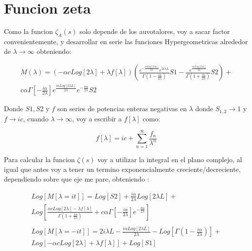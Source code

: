 \section{Funcion zeta}

Como la funcion $\zeta _A (s) $ solo depende de los auvotalores, voy a sacar factor convenientemente, y desarrollar en serie las funciones Hypergeometricas alrededor de $\lambda \rightarrow \infty$ obteniendo:

\begin{equation}
\begin{array}{c}
M (\lambda) = 
 (- \alpha c Log[2 \lambda] + \lambda f[ \lambda ] ) 
 \left(
 \frac{e ^{ - \frac{i \alpha Log[2 \lambda L ]}{2 \lambda } } e ^{2 i \lambda L } }
 {\Gamma ( 1 - \frac{i \alpha}{2 \lambda} )} S1 - 
 \frac{e ^{   \frac{i \alpha Log[2 \lambda L ]}{2 \lambda } } }
 	  {\Gamma (1 + \frac{i \alpha}{2 \lambda})} S2 
 \right)  + \\
 c \alpha \Gamma \left[ - \frac{i \alpha}{2 \lambda} \right]
 e ^{ \frac{i \alpha Log[2 \lambda L]}{2 \lambda}} 
 e ^{- \frac{\pi \alpha}{2 \lambda}} 
 S2 
\end{array}
\end{equation}

Donde $S1,S2$ y $f$ son series de potencias enteras negativas en $\lambda$ donde $S _{1,2} \rightarrow 1$ y $f \rightarrow i c$, cuando $\lambda \rightarrow \infty$, voy a escribir a $f[\lambda]$ como:

\begin{equation}
f[\lambda] = i c + \sum _{n=1} ^{\infty} \frac{f _n}{\lambda ^n}
\end{equation}



Para calcular la funcion $\zeta (s) $ voy a utilizar la integral en el plano complejo, al igual que antes voy a tener un termino exponencialmente creciente/decreciente, dependiendo sobre que eje me pare, obteniendo : 

\begin{equation}
\begin{array}{c}
Log[M[\lambda = i t]] = 
Log[S2] +
\frac{i \alpha}{2 \lambda} Log[2 \lambda L] +  \\
Log[
	\frac{\alpha c Log[2 \lambda] - \lambda f[\lambda] }{\Gamma (1 + \frac{i \alpha}{ 2 \lambda})} + 
	c \alpha \Gamma \left[- \frac{i \alpha}{2 \lambda} \right] 
	e ^{- \frac{ \pi \alpha}{2 \lambda}} ] \\ \\
	
Log[M[\lambda = - i t]] = 
2 i \lambda L -
\frac{i \alpha Log[2 \lambda L]}{2 \lambda} -
Log[\Gamma (1- \frac{i \alpha}{2 \lambda}) ] + \\
Log[
	- \alpha c Log[2 \lambda] +
	\lambda f[\lambda]
	] +
Log[S1]
\end{array}
\end{equation}


